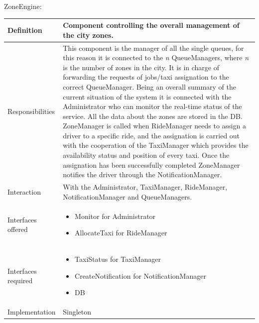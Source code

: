 \documentclass[a4paper,11pt]{report} %
\begin{document}
	\pagebreak
	\centerline{ZoneEngine:}
	\begin{center}
		\begin{tabular}{| l | p{9cm} |}\hline
			Definition & Component controlling the overall management of the city zones.\\\hline
			Responsibilities & This component is the manager of all the single queues, for this reason it is connected to the \textit{n} QueueManagers, where \textit{n} is the number of zones in the city. It is in charge of forwarding the requests of jobs/taxi assignation to the correct QueueManager. Being an overall summary of the current situation of the system it is connected with the Administrator who can monitor the real-time status of the service. All the data about the zones are stored in the DB. ZoneManager is called when RideManager needs to assign a driver to a specific ride, and the assignation is carried out with the cooperation of the TaxiManager which provides the availability status and position of every taxi. Once the assignation has been successfully completed ZoneManager notifies the driver through the NotificationManager.\\\hline
			Interaction & With the Administrator, TaxiManager, RideManager, NotificationManager and QueueManagers.\\\hline
			Interfaces offered & \begin{itemize}
				\item Monitor for Administrator
				\item AllocateTaxi for RideManager
			\end{itemize}\\\hline
			Interfaces required & \begin{itemize}
				\item TaxiStatus for TaxiManager
				\item CreateNotification for NotificationManager
				\item DB
			\end{itemize}\\\hline
			Implementation & Singleton\\\hline
		\end{tabular}
	\end{center}
	

	\pagebreak
\end{document}
